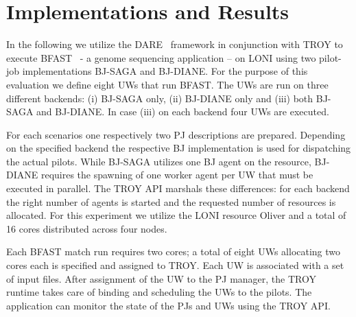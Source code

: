 \documentclass[conference,final]{IEEEtran}
\newcommand{\smnote}[1]{ {\textcolor{green} { ***sharath: #1 }}}
\newcommand{\smnote}[1]{}
\newcommand{\upp}{\vspace*{-0.5em}}
\begin{document}
\section{Implementations and Results\upp\upp}


In the following we utilize the DARE~\cite{dare-tg11} framework in conjunction
with TROY to execute BFAST~\cite{bfast2009} - a genome sequencing application --
on LONI using two pilot-job implementations BJ-SAGA and BJ-DIANE. For the
purpose of this evaluation we define eight UWs that run BFAST. The UWs are run
on three different backends: (i) BJ-SAGA only, (ii) BJ-DIANE only and (iii) both
BJ-SAGA and BJ-DIANE. In case (iii) on each backend four UWs are executed.

For each scenarios one respectively two PJ descriptions are prepared. Depending
on the specified backend the respective BJ implementation is used for
dispatching the actual pilots. While BJ-SAGA utilizes one BJ agent on the
resource, BJ-DIANE requires the spawning of one worker agent per UW that must be
executed in parallel. The TROY API marshals these
differences: for each backend the right number of agents is started and the
requested number of resources is allocated. For this experiment we utilize the
LONI resource Oliver and a total of 16 cores distributed across four nodes.

Each BFAST match run requires two cores; a total of eight UWs allocating two
cores each is specified and assigned to TROY. Each UW is associated with a set of input files. After assignment of the UW to the PJ manager, the
TROY runtime takes care of binding and scheduling the UWs to the pilots. The
application can monitor the state of the PJs and UWs using the TROY API.



\end{document}
